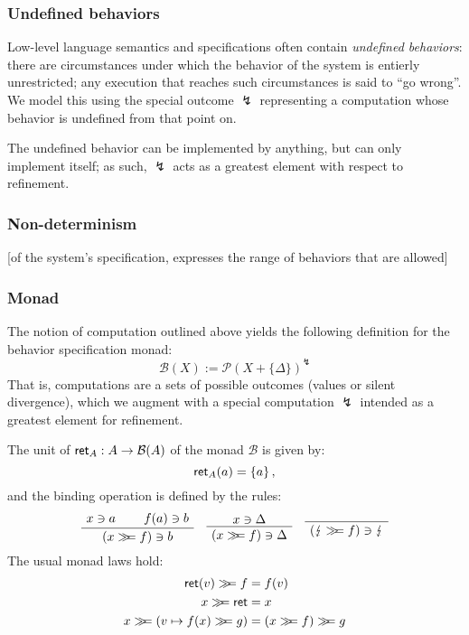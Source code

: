 
\subsubsection{Undefined behaviors} %

Low-level language semantics and specifications
often contain \emph{undefined behaviors}:
there are circumstances under which the behavior of the system
is entierly unrestricted;
any execution that reaches such circumstances is said to ``go wrong''.
We model this using the special outcome $\lightning$
representing a computation whose behavior is undefined
from that point on.

The undefined behavior can be implemented by anything,
but can only implement itself;
as such,
$\lightning$
acts as a greatest element with respect to refinement.


\subsubsection{Non-determinism} %

[of the system's specification,
expresses the range of behaviors that are allowed]


\subsubsection{Monad}

The notion of computation outlined above
yields the following definition
for the behavior specification monad:
\[
    \mathcal{B}(X) := \mathcal{P}(X + \{\Delta\})^\lightning
\]
That is,
computations are a sets of possible outcomes (values or silent divergence),
which we augment with a special computation $\lightning$
intended as a greatest element for refinement.

The unit of $ \mathsf{ret} _A : A \rightarrow \mathcal{B}(A)$
of the monad $\mathcal{B}$ is given by:
\[
     \mathsf{ret} _A(a) = \{ a \} \,,
\]
and the binding operation is defined by the rules:
\[
    \AxiomC{$x \ni a$}
    \AxiomC{$f(a) \ni b$}
    \BinaryInfC{$(x \bind f) \ni b$}
    \DisplayProof
    \quad
    \AxiomC{$x \ni \Delta$}
    \UnaryInfC{$(x \bind f) \ni \Delta$}
    \DisplayProof
    \quad
    \AxiomC{}
    \UnaryInfC{$(\lightning \bind f) \ni \lightning$}
    \DisplayProof
\]
The usual monad laws hold:
\begin{align*}
    \kw{ret}(v) \bind f &= f(v) \\
    x \bind \kw{ret} &= x \\
    x \bind (v \mapsto f(x) \bind g) &= (x \bind f) \bind g
\end{align*}

